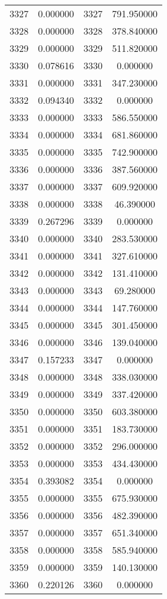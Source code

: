 \documentclass[12pt]{article}
\begin{document}
\begin{longtable}{@{}cccc@{}}
3327 & 0.000000 & 3327 & 791.950000 \\
3328 & 0.000000 & 3328 & 378.840000 \\
3329 & 0.000000 & 3329 & 511.820000 \\
3330 & 0.078616 & 3330 & 0.000000 \\
3331 & 0.000000 & 3331 & 347.230000 \\
3332 & 0.094340 & 3332 & 0.000000 \\
3333 & 0.000000 & 3333 & 586.550000 \\
3334 & 0.000000 & 3334 & 681.860000 \\
3335 & 0.000000 & 3335 & 742.900000 \\
3336 & 0.000000 & 3336 & 387.560000 \\
3337 & 0.000000 & 3337 & 609.920000 \\
3338 & 0.000000 & 3338 & 46.390000 \\
3339 & 0.267296 & 3339 & 0.000000 \\
3340 & 0.000000 & 3340 & 283.530000 \\
3341 & 0.000000 & 3341 & 327.610000 \\
3342 & 0.000000 & 3342 & 131.410000 \\
3343 & 0.000000 & 3343 & 69.280000 \\
3344 & 0.000000 & 3344 & 147.760000 \\
3345 & 0.000000 & 3345 & 301.450000 \\
3346 & 0.000000 & 3346 & 139.040000 \\
3347 & 0.157233 & 3347 & 0.000000 \\
3348 & 0.000000 & 3348 & 338.030000 \\
3349 & 0.000000 & 3349 & 337.420000 \\
3350 & 0.000000 & 3350 & 603.380000 \\
3351 & 0.000000 & 3351 & 183.730000 \\
3352 & 0.000000 & 3352 & 296.000000 \\
3353 & 0.000000 & 3353 & 434.430000 \\
3354 & 0.393082 & 3354 & 0.000000 \\
3355 & 0.000000 & 3355 & 675.930000 \\
3356 & 0.000000 & 3356 & 482.390000 \\
3357 & 0.000000 & 3357 & 651.340000 \\
3358 & 0.000000 & 3358 & 585.940000 \\
3359 & 0.000000 & 3359 & 140.130000 \\
3360 & 0.220126 & 3360 & 0.000000 \\

\end{longtable}
\end{document}
